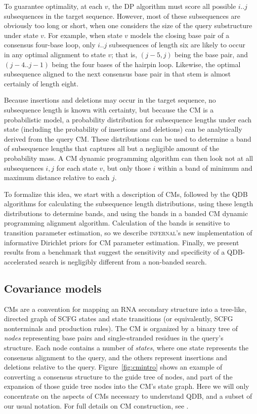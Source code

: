 \documentclass[11pt]{article}
\begin{document}
To guarantee optimality, at each $v$, the DP algorithm must score all
possible $i..j$ subsequences in the target sequence.  However, most of
these subsequences are obviously too long or short, when one considers
the size of the query substructure under state $v$.  For example, when
state $v$ models the closing base pair of a consensus four-base loop,
only $i..j$ subsequences of length six are likely to occur in any
optimal alignment to state $v$; that is, $(j-5,j)$ being the base
pair, and $(j-4..j-1)$ being the four bases of the hairpin
loop. Likewise, the optimal subsequence aligned to the next consensus
base pair in that stem is almost certainly of length eight.

Because insertions and deletions may occur in the target sequence, no
subsequence length is known with certainty, but because the CM is a
probabilistic model, a probability distribution for subsequence
lengths under each state (including the probability of insertions and
deletions) can be analytically derived from the query CM.  These
distributions can be used to determine a band of subsequence lengths
that captures all but a negligible amount of the probability mass. A
CM dynamic programming algorithm can then look not at all subsequences
$i,j$ for each state $v$, but only those $i$ within a band of minimum
and maximum distance relative to each $j$.

To formalize this idea, we start with a description of CMs, followed
by the QDB algorithms for calculating the subsequence length
distributions, using these length distributions to determine bands,
and using the bands in a banded CM dynamic programming alignment
algorithm. Calculation of the bands is sensitive to transition
parameter estimation, so we describe \textsc{infernal}'s new
implementation of informative Dirichlet priors for CM parameter
estimation. Finally, we present results from a benchmark that suggest
the sensitivity and specificity of a QDB-accelerated search is
negligibly different from a non-banded search.

\subsection{Covariance models}

CMs are a convention for mapping an RNA secondary structure into a
tree-like, directed graph of SCFG states and state transitions (or
equivalently, SCFG nonterminals and production rules). The CM is
organized by a binary tree of \emph{nodes} representing base pairs and
single-stranded residues in the query's structure.  Each node contains
a number of \emph{states}, where one state represents the consensus
alignment to the query, and the others represent insertions and
deletions relative to the query.  Figure~\ref{fig:cmintro} shows an
example of converting a consensus structure to the guide tree of
nodes, and part of the expansion of those guide tree nodes into the
CM's state graph. Here we will only concentrate on the aspects of CMs
necessary to understand QDB, and a subset of our usual notation. For
full details on CM construction, see \cite{Eddy02b,infguide03}.
\end{document}
